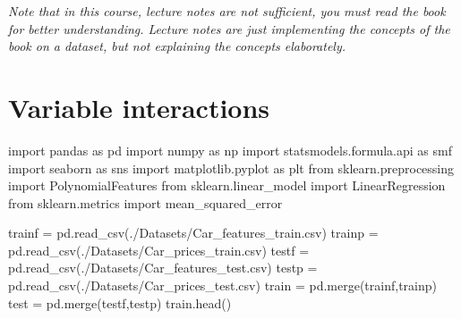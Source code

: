 \documentclass[
  letterpaper,
  DIV=11,
  numbers=noendperiod]{scrreprt}
\newenvironment{Shaded}{\begin{snugshade}}{\end{snugshade}}
\newcommand{\ImportTok}[1]{\textcolor[rgb]{0.00,0.46,0.62}{#1}}
\newcommand{\NormalTok}[1]{\textcolor[rgb]{0.00,0.23,0.31}{#1}}
\newcommand{\OperatorTok}[1]{\textcolor[rgb]{0.37,0.37,0.37}{#1}}
\newcommand{\StringTok}[1]{\textcolor[rgb]{0.13,0.47,0.30}{#1}}
\begin{document}
\emph{Note that in this course, lecture notes are not sufficient, you
must read the book for better understanding. Lecture notes are just
implementing the concepts of the book on a dataset, but not explaining
the concepts elaborately.}

\section{Variable interactions}\label{variable-interactions}

\begin{Shaded}
\begin{Highlighting}[]
\ImportTok{import}\NormalTok{ pandas }\ImportTok{as}\NormalTok{ pd}
\ImportTok{import}\NormalTok{ numpy }\ImportTok{as}\NormalTok{ np}
\ImportTok{import}\NormalTok{ statsmodels.formula.api }\ImportTok{as}\NormalTok{ smf}
\ImportTok{import}\NormalTok{ seaborn }\ImportTok{as}\NormalTok{ sns}
\ImportTok{import}\NormalTok{ matplotlib.pyplot }\ImportTok{as}\NormalTok{ plt}
\ImportTok{from}\NormalTok{ sklearn.preprocessing }\ImportTok{import}\NormalTok{ PolynomialFeatures}
\ImportTok{from}\NormalTok{ sklearn.linear\_model }\ImportTok{import}\NormalTok{ LinearRegression}
\ImportTok{from}\NormalTok{ sklearn.metrics }\ImportTok{import}\NormalTok{ mean\_squared\_error}
\end{Highlighting}
\end{Shaded}

\begin{Shaded}
\begin{Highlighting}[]
\NormalTok{trainf }\OperatorTok{=}\NormalTok{ pd.read\_csv(}\StringTok{\textquotesingle{}./Datasets/Car\_features\_train.csv\textquotesingle{}}\NormalTok{)}
\NormalTok{trainp }\OperatorTok{=}\NormalTok{ pd.read\_csv(}\StringTok{\textquotesingle{}./Datasets/Car\_prices\_train.csv\textquotesingle{}}\NormalTok{)}
\NormalTok{testf }\OperatorTok{=}\NormalTok{ pd.read\_csv(}\StringTok{\textquotesingle{}./Datasets/Car\_features\_test.csv\textquotesingle{}}\NormalTok{)}
\NormalTok{testp }\OperatorTok{=}\NormalTok{ pd.read\_csv(}\StringTok{\textquotesingle{}./Datasets/Car\_prices\_test.csv\textquotesingle{}}\NormalTok{)}
\NormalTok{train }\OperatorTok{=}\NormalTok{ pd.merge(trainf,trainp)}
\NormalTok{test }\OperatorTok{=}\NormalTok{ pd.merge(testf,testp)}
\NormalTok{train.head()}
\end{Highlighting}
\end{Shaded}
\end{document}

